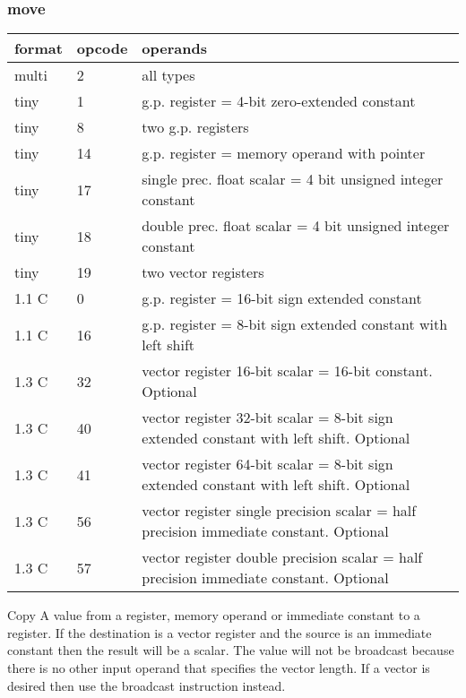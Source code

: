 \documentclass[forwardcom.tex]{subfiles}
\begin{document}
\subsubsection{move}
\label{table:moveInstruction}
\begin{tabular}{|p{12mm}|p{12mm}|p{110mm}|}
\hline
\bfseries format & \bfseries opcode & \bfseries operands \\ \hline
multi & 2 & all types \\ \hline
tiny  & 1 & g.p. register = 4-bit zero-extended constant \\ \hline
tiny  & 8 & two g.p. registers \\ \hline
tiny  & 14 & g.p. register = memory operand with pointer \\ \hline
tiny  & 17 & single prec. float scalar = 4 bit unsigned integer constant \\ \hline
tiny  & 18 & double prec. float scalar = 4 bit unsigned integer constant \\ \hline
tiny  & 19 & two vector registers \\ \hline
1.1 C &  0 & g.p. register = 16-bit sign extended constant \\ \hline
1.1 C & 16 & g.p. register = 8-bit sign extended constant with left shift \\ \hline
1.3 C & 32 & vector register 16-bit scalar = 16-bit constant. Optional  \\ \hline
1.3 C & 40 & vector register 32-bit scalar = 8-bit sign extended constant with left shift. Optional \\ \hline
1.3 C & 41 & vector register 64-bit scalar = 8-bit sign extended constant with left shift. Optional \\ \hline
1.3 C & 56 & vector register single precision scalar = half precision immediate constant. Optional \\ \hline
1.3 C & 57 & vector register double precision scalar = half precision immediate constant. Optional \\ \hline
\end{tabular}
\vspace{2mm}

Copy A value from a register, memory operand or immediate constant to a register. If the destination is a vector register and the source is an immediate constant then the result will be a scalar. The value will not be broadcast because there is no other input operand that specifies the vector length. If a vector is desired then use the broadcast instruction instead.
\vspace{2mm}
\end{document}
